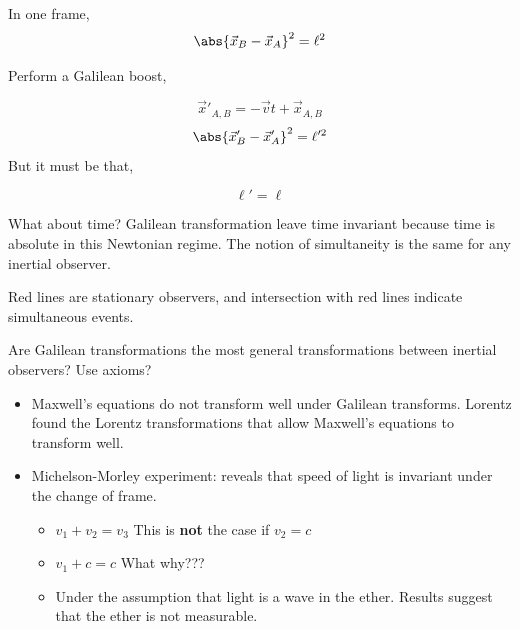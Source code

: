 \documentclass{article}
\begin{document}
In one frame,
\[ \abs{\vec{x}_B - \vec{x}_A }^2 = \ell^2 \]

Perform a Galilean boost,

\[ \vec{x}'_{A,B} = -\vec{v}t + \vec{x}_{A,B} \]
\[ \abs{\vec{x}'_B - \vec{x}'_A }^2 = \ell'^2 \]
But it must be that,

\[ \ell' = \ell \]

What about time? Galilean transformation leave time invariant because time is absolute in this Newtonian regime. The notion of simultaneity is the same for any inertial observer.


\begin{center}
\end{center}

Red lines are stationary observers, and intersection with red lines indicate simultaneous events.


Are Galilean transformations the most general transformations between inertial observers? Use axioms?


\begin{itemize}
    \item Maxwell's equations do not transform well under Galilean transforms. Lorentz found the Lorentz transformations that allow Maxwell's equations to transform well.
    \item Michelson-Morley experiment: reveals that speed of light is invariant under the change of frame.
    \begin{itemize}
        \item $v_1 + v_2 = v_3$ This is \textbf{not} the case if $v_2 = c$
        \item $v_1 + c = c$ What why???
        \item Under the assumption that light is a wave in the ether. Results suggest that the ether is not measurable.
    \end{itemize}
\end{itemize}
\end{document}
